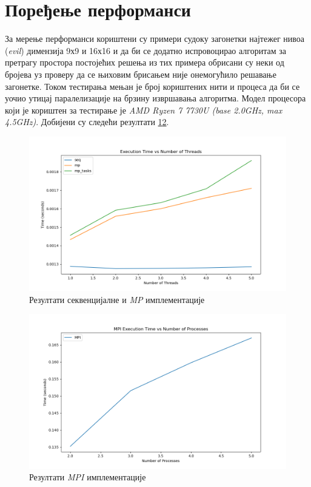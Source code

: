 \section{Поређење перформанси}
За мерење перформанси кориштени су примери судоку загонетки најтежег нивоа (\textit{evil}) димензија 9х9 и 16х16 и да би се додатно испровоцирао алгоритам за претрагу простора постојећих решења из тих примера обрисани су неки од бројева уз проверу да се њиховим брисањем није онемогућило решавање загонетке. Током тестирања мењан је број кориштених нити и процеса да би се уочио утицај паралелизације на брзину извршавања алгоритма. Модел процесора који је кориштен за тестирање је \textit{AMD Ryzen 7 7730U (base 2.0GHz, max 4.5GHz)}. Добијени су следећи резултати \ref{fig:seq_mp_results}\ref{fig:mpi_results}.

\begin{figure}[H]
    \centering
    \includegraphics[width=1\textwidth]{images/graph_1.png}
    \caption{Резултати секвенцијалне и \textit{MP} имплементације}
    \label{fig:seq_mp_results}
\end{figure}

\begin{figure}[H]
    \centering
    \includegraphics[width=1\textwidth]{images/graph_2.png}
    \caption{Резултати \textit{MPI} имплементације}
    \label{fig:mpi_results}
\end{figure}

